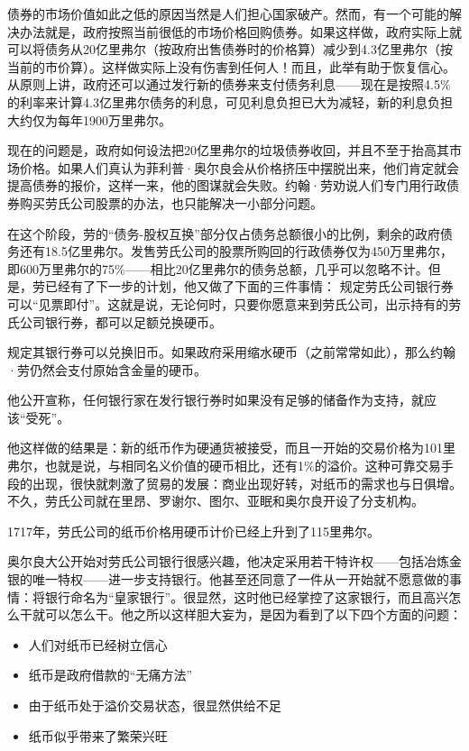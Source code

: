 \documentclass[12pt,oneside]{book}
\begin{document}
债券的市场价值如此之低的原因当然是人们担心国家破产。然而，有一个可能的解决办法就是，政府按照当前很低的市场价格回购债券。如果这样做，政府实际上就可以将债务从20亿里弗尔（按政府出售债券时的价格算）减少到4.3亿里弗尔（按当前的市价算）。这样做实际上没有伤害到任何人！而且，此举有助于恢复信心。从原则上讲，政府还可以通过发行新的债券来支付债务利息——现在是按照4.5\%的利率来计算4.3亿里弗尔债务的利息，可见利息负担已大为减轻，新的利息负担大约仅为每年1900万里弗尔。

现在的问题是，政府如何设法把20亿里弗尔的垃圾债券收回，并且不至于抬高其市场价格。如果人们真认为菲利普·奥尔良会从价格挤压中摆脱出来，他们肯定就会提高债券的报价，这样一来，他的图谋就会失败。约翰·劳劝说人们专门用行政债券购买劳氏公司股票的办法，也只能解决一小部分问题。

在这个阶段，劳的“债务-股权互换”部分仅占债务总额很小的比例，剩余的政府债务还有18.5亿里弗尔。发售劳氏公司的股票所购回的行政债券仅为450万里弗尔，即600万里弗尔的75\%——相比20亿里弗尔的债务总额，几乎可以忽略不计。但是，劳已经有了下一步的计划，他又做了下面的三件事情：
规定劳氏公司银行券可以“见票即付”。这就是说，无论何时，只要你愿意来到劳氏公司，出示持有的劳氏公司银行券，都可以足额兑换硬币。

规定其银行券可以兑换旧币。如果政府采用缩水硬币（之前常常如此），那么约翰·劳仍然会支付原始含金量的硬币。

他公开宣称，任何银行家在发行银行券时如果没有足够的储备作为支持，就应该“受死”。

他这样做的结果是：新的纸币作为硬通货被接受，而且一开始的交易价格为101里弗尔，也就是说，与相同名义价值的硬币相比，还有1\%的溢价。这种可靠交易手段的出现，很快就刺激了贸易的发展：商业出现好转，对纸币的需求也与日俱增。不久，劳氏公司就在里昂、罗谢尔、图尔、亚眠和奥尔良开设了分支机构。

1717年，劳氏公司的纸币价格用硬币计价已经上升到了115里弗尔。

奥尔良大公开始对劳氏公司银行很感兴趣，他决定采用若干特许权——包括冶炼金银的唯一特权——进一步支持银行。他甚至还同意了一件从一开始就不愿意做的事情：将银行命名为“皇家银行”。很显然，这时他已经掌控了这家银行，而且高兴怎么干就可以怎么干。他之所以这样胆大妄为，是因为看到了以下四个方面的问题：

\begin{itemize}
\item 人们对纸币已经树立信心
\item 纸币是政府借款的“无痛方法”
\item 由于纸币处于溢价交易状态，很显然供给不足
\item 纸币似乎带来了繁荣兴旺
\end{itemize}
\end{document}
